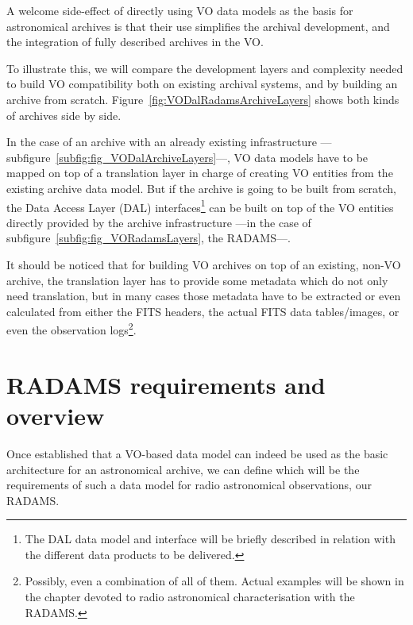 		A welcome side-effect of directly using VO data 
		models as the basis for astronomical archives is that
		their use simplifies the archival development, and the
		integration of fully described archives in the VO.
		
		To illustrate this,  we will compare the
		development layers and complexity needed to build VO
		compatibility both on existing archival systems, and 
		by building an archive from scratch.
		Figure~\ref{fig:VODalRadamsArchiveLayers} shows both
		kinds of archives side by side.
		
		In the case of an archive with an already existing
		infrastructure
		---sub\-fi\-gu\-re~\ref{subfig:fig_VODalArchiveLayers}---,
		VO data models have to be mapped on top of a translation
		layer in charge of creating VO entities from the existing
		archive data model. But if the archive is going to be built
		from scratch, the Data Access Layer (DAL)
		interfaces\footnote{The DAL data model and interface will
		be briefly described in relation with the different data
		products to be delivered.} can be built on top of the VO
		entities directly provided by the archive infrastructure
		---in the case of
		sub\-fi\-gu\-re~\ref{subfig:fig_VORadamsLayers}, the
		RADAMS---.
		
		It should be noticed that for building VO archives on top
		of an existing, non-VO archive, the translation layer has
		to provide some metadata which do not only need
		translation, but in many cases those metadata have to be
		extracted or even calculated from either the FITS headers,
		the actual FITS data tables/images, or even the observation
		logs\footnote{Possibly, even a combination of all of
		them. Actual examples will be shown in the chapter devoted
		to radio astronomical characterisation with the RADAMS.}.
		
		
	
	\section{RADAMS requirements and overview} %
	\label{sec:radams_requirements_overview}
		Once established that a VO-based data model can indeed be
		used as the basic architecture for an astronomical
		archive, we can define which will be the requirements of
		such a data model for radio astronomical observations,
		our RADAMS.
		
